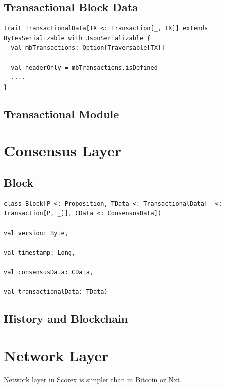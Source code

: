 \documentclass[]{report}   %
\begin{document}
\subsection{Transactional Block Data}

\begin{lstlisting}
trait TransactionalData[TX <: Transaction[_, TX]] extends BytesSerializable with JsonSerializable {
  val mbTransactions: Option[Traversable[TX]]

  val headerOnly = mbTransactions.isDefined
  ....
}
\end{lstlisting}

\subsection{Transactional Module}



\section{Consensus Layer}

\subsection{Block}

\begin{lstlisting}
class Block[P <: Proposition, TData <: TransactionalData[_ <: Transaction[P, _]], CData <: ConsensusData](
                                                                                      val version: Byte,
                                                                                      val timestamp: Long,
                                                                                      val consensusData: CData,
                                                                                      val transactionalData: TData)
\end{lstlisting}

\subsection{History and Blockchain}

\section{Network Layer}

Network layer in Scorex is simpler than in Bitcoin or Nxt. 
\end{document}
